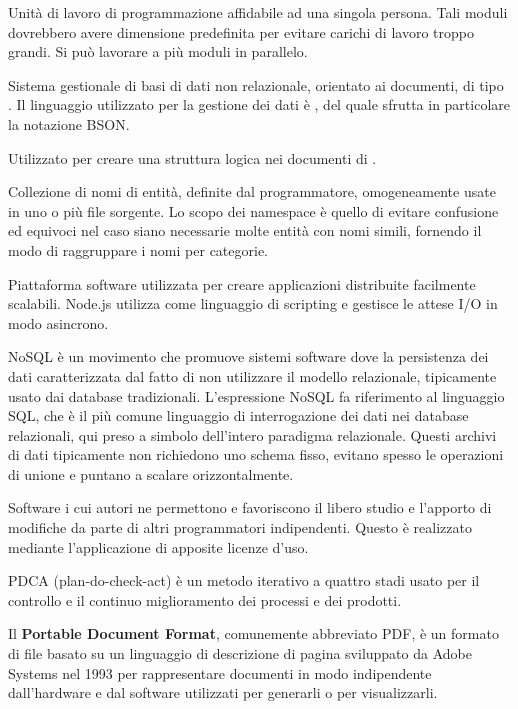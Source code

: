 Unità di lavoro di programmazione affidabile ad una singola persona. Tali moduli dovrebbero avere dimensione predefinita per evitare carichi di lavoro troppo grandi. Si può lavorare a più moduli in parallelo.

Sistema gestionale di basi di dati non relazionale, orientato ai documenti, di tipo . Il linguaggio utilizzato per la gestione dei dati è , del quale sfrutta in particolare la notazione BSON.

Utilizzato per creare una struttura logica nei documenti di .


Collezione di nomi di entità, definite dal programmatore, omogeneamente usate in uno o più file sorgente.  Lo scopo dei namespace è quello di evitare confusione ed equivoci nel caso siano necessarie molte entità con nomi simili, fornendo il modo di raggruppare i nomi per categorie. 

Piattaforma software utilizzata per creare applicazioni distribuite facilmente scalabili.
Node.js utilizza  come linguaggio di scripting e gestisce le attese I/O in modo asincrono.

NoSQL è un movimento che promuove sistemi software dove la persistenza dei dati caratterizzata dal fatto di non utilizzare il modello relazionale, tipicamente usato dai database tradizionali. L'espressione NoSQL fa riferimento al linguaggio SQL, che è il più comune linguaggio di interrogazione dei dati nei database relazionali, qui preso a simbolo dell'intero paradigma relazionale.
Questi archivi di dati tipicamente non richiedono uno schema fisso, evitano spesso le operazioni di unione e puntano a scalare orizzontalmente.


Software i cui autori ne permettono e favoriscono il libero studio e l'apporto di modifiche da parte di altri programmatori indipendenti. Questo è realizzato mediante l'applicazione di apposite licenze d'uso.


PDCA (plan-do-check-act) è un metodo iterativo a quattro stadi usato per il controllo e il continuo miglioramento dei processi e dei prodotti.

Il \textbf{Portable Document Format}, comunemente abbreviato PDF, è un formato di file basato su un linguaggio di descrizione di pagina sviluppato da Adobe Systems nel 1993 per rappresentare documenti in modo indipendente dall'hardware e dal software utilizzati per generarli o per visualizzarli. 

